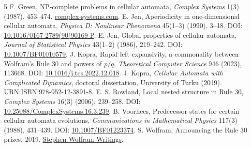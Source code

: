 \documentclass[11pt]{article}
\begin{document}
\begin{thebibliography}{5}\footnotesize
\setlength{\itemsep}{1pt}\setlength{\parskip}{0pt}
 F. Green, NP-complete problems in cellular automata,
\emph{Complex Systems} 1(3) (1987), 453--474.
\href{https://www.complex-systems.com/abstracts/v01_i03_a04/}{complex-systems.com}.
 E. Jen, Aperiodicity in one-dimensional cellular automata,
\emph{Physica D: Nonlinear Phenomena} 45(1--3) (1990), 3--18.
DOI: \href{https://doi.org/10.1016/0167-2789(90)90169-P}{10.1016/0167-2789(90)90169-P}.
 E. Jen, Global properties of cellular automata,
\emph{Journal of Statistical Physics} 43(1--2) (1986), 219--242.
DOI: \href{https://doi.org/10.1007/BF01010579}{10.1007/BF01010579}.
 J. Kopra, Rapid left expansivity, a commonality between
Wolfram's Rule 30 and powers of $p/q$, \emph{Theoretical Computer Science}
946 (2023), 113668.
DOI: \href{https://doi.org/10.1016/j.tcs.2022.12.018}{10.1016/j.tcs.2022.12.018}.
 J. Kopra, \emph{Cellular Automata with Complicated
Dynamics}, doctoral dissertation, University of Turku (2019).
\href{https://urn.fi/URN:ISBN:978-952-12-3891-8}{URN:ISBN:978-952-12-3891-8}.
 E. S. Rowland, Local nested structure in Rule 30,
\emph{Complex Systems} 16(3) (2006), 239--258.
DOI: \href{https://doi.org/10.25088/ComplexSystems.16.3.239}{10.25088/ComplexSystems.16.3.239}.
 B. Voorhees, Predecessor states for certain cellular
automata evolutions, \emph{Communications in Mathematical Physics} 117(3)
(1988), 431--439.
DOI: \href{https://doi.org/10.1007/BF01223374}{10.1007/BF01223374}.
 S. Wolfram, Announcing the Rule 30 prizes, 2019.
\href{https://writings.stephenwolfram.com/2019/10/announcing-the-rule-30-prizes/}
{Stephen Wolfram Writings}.
\end{thebibliography}
\end{document}
